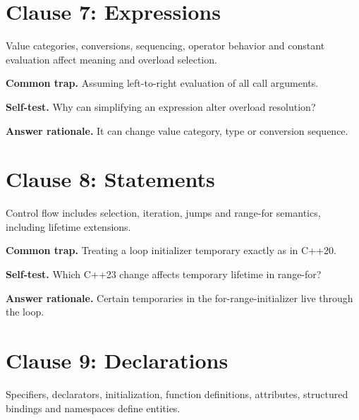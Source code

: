 \documentclass[11pt]{article}
\begin{document}
\section{Clause 7: Expressions}
Value categories, conversions, sequencing, operator behavior and constant evaluation affect meaning and overload selection.

\textbf{Common trap.} Assuming left-to-right evaluation of all call arguments.

\textbf{Self-test.} Why can simplifying an expression alter overload resolution?

\textbf{Answer rationale.} It can change value category, type or conversion sequence.

\section{Clause 8: Statements}
Control flow includes selection, iteration, jumps and range-for semantics, including lifetime extensions.

\textbf{Common trap.} Treating a loop initializer temporary exactly as in C++20.

\textbf{Self-test.} Which C++23 change affects temporary lifetime in range-for?

\textbf{Answer rationale.} Certain temporaries in the for-range-initializer live through the loop.

\section{Clause 9: Declarations}
Specifiers, declarators, initialization, function definitions, attributes, structured bindings and namespaces define entities.
\end{document}
